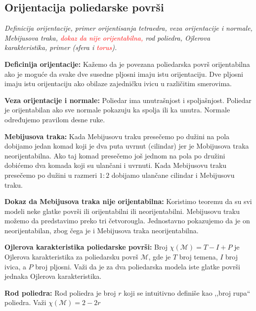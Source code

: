 \documentclass[12pt]{article}
\newcommand{\ocena}[1]{\textcolor{red}{#1}}
\begin{document}
\subsection{Orijentacija poliedarske površi}
\textit{Definicija orijentacije, primer orijentisanja tetraedra, veza
    orijentacije i normale, Mebijusova traka, \ocena{dokaz da nije orijentabilna,} rod
    poliedra, Ojlerova karakteristika, primer (sfera i \ocena{torus}).}
\par
\vspace*{1cm}

\textbf{Deficinija orijentacije:} Kažemo da je povezana poliedarska površ
orijentabilna ako je moguće da svake dve susedne pljosni imaju istu
orijentaciju. Dve pljosni imaju istu orijentaciju ako obilaze zajedničku ivicu
u različitim smerovima.
\par

\textbf{Veza orijentacije i normale:} Poliedar ima unutrašnjost i spoljašnjost.
Poliedar je orijentabilan ako sve normale pokazuju ka spolja ili ka unutra.
Normale određujemo pravilom desne ruke.
\par

\textbf{Mebijusova traka:} Kada Mebijusovu traku presečemo po dužini na pola
dobijamo jedan komad koji je dva puta uvrnut (cilindar) jer je Mobijusova traka
neorijentabilna. Ako taj komad presečemo još jednom na pola po družini dobićemo
dva komada koji su ulančani i uvrnuti. Kada Mebijusovu traku presečemo po
dužini u razmeri $1:2$ dobijamo ulančane cilindar i Mebijusovu traku.
\par

\textbf{Dokaz da Mebijusova traka nije orijentabilna:} Koristimo teoremu da su
svi modeli neke glatke površi ili orijentabilni ili neorijentabilni. Mebijusovu
traku možemo da predstavimo preko tri četvorougla. Jednostavno pokazujemo da je
on neorijentabilan, zbog čega je i Mebijusova traka neorijentabilna.
\par

\textbf{Ojlerova karakteristika poliedarske površi:} Broj
$\chi(\mathcal{M})=T-I+P$ je Ojlerova karakteristika za poliedarsku površ
$\mathcal{M}$, gde je $T$ broj temena, $I$ broj ivica, a $P$ broj pljosni. Važi
da je za dva poliedarska modela iste glatke površi jednaka Ojlerova
karakteristika.
\par

\textbf{Rod poliedra:} Rod poliedra je broj $r$ koji se intuitivno definiše kao
,,broj rupa`` poliedra. Važi $\chi(\mathcal{M})=2-2r$
\par
\end{document}
